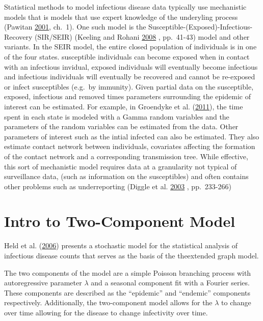 \documentclass[]{article}
\numberwithin{equation}{section}
\begin{document}
Statistical methods to model infectious disease data typically use
mechanistic models that is models that use expert knowledge of the
underyling process (Pawitan
\protect\hyperlink{ref-pawitan_all_2001}{2001}, ch.~1). One such model
is the Susceptible-(Exposed)-Infectious-Recovery (SIR/SEIR) (Keeling and
Rohani \protect\hyperlink{ref-keeling_modeling_2008}{2008} , pp.~41-43)
model and other variants. In the SEIR model, the entire closed
population of individuals is in one of the four states. susceptible
individuals can become exposed when in contact with an infectious
invidual, exposed individuals will eventually become infectious and
infectious individuals will eventually be recovered and cannot be
re-exposed or infect susceptibles (e.g.~by immunity). Given partial data
on the susceptible, exposed, infectious and removed times parameters
surrounding the epidemic of interest can be estimated. For example, in
Groendyke et al.
(\protect\hyperlink{ref-groendyke_bayesian_2011}{2011}), the time spent
in each state is modeled with a Gamma random variables and the
parameters of the random variables can be estimated from the data. Other
parameters of interest such as the intial infected can also be
estimated. They also estimate contact network between individuals,
covariates affecting the formation of the contact network and a
corresponding transmission tree. While effective, this sort of
mechanistic model requires data at a granularity not typical of
surveillance data, (such as information on the susceptibles) and often
contains other problems such as underreporting (Diggle et al.
\protect\hyperlink{ref-diggle_-line_2003}{2003} , pp.~233-266)

\hypertarget{intro-to-two-component-model}{%
\section{Intro to Two-Component
Model}\label{intro-to-two-component-model}}

Held et al. (\protect\hyperlink{ref-held_two-component_2006}{2006})
presents a stochastic model for the statistical analysis of infectious
disease counts that serves as the basis of the theextended graph model.

The two components of the model are a simple Poisson branching process
with autoregressive parameter \(\lambda\) and a seasonal component fit
with a Fourier series. These components are described as the
``epidemic'' and ``endemic'' components respectively. Additionally, the
two-component model allows for the \(\lambda\) to change over time
allowing for the disease to change infectivity over time.
\end{document}
